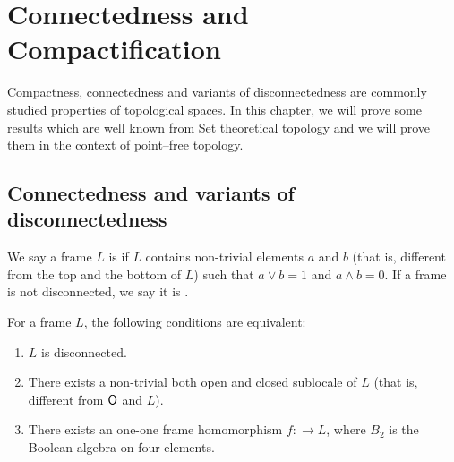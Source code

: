 \chapter{Connectedness and Compactification}

Compactness, connectedness and variants of disconnectedness are commonly studied properties of topological spaces. In this chapter, we will prove some results which are well known from Set theoretical topology and we will prove them in the context of point--free topology.

\section{Connectedness and variants of disconnectedness}
\begin{definition}
    We say a frame $L$ is  if $L$ contains non-trivial elements $a$ and $b$ (that is, different from the top and the bottom of $L$) such that $a\vee b = 1$ and $a\wedge b = 0$. If a frame is not disconnected, we say it is .
\end{definition}

\begin{observation}\label{p:disconnectednessEquivalently}
    For a frame $L$, the following conditions are equivalent:

    \begin{enumerate}
        \item $L$ is disconnected.
        \item There exists a non-trivial both open and closed sublocale of $L$ (that is, different from $\mathsf{O}$ and $L$).
        \item There exists an one-one frame homomorphism $f\colon $$ \to L$, where $B_2$ is the Boolean algebra on four elements.
    \end{enumerate}
\end{observation}


